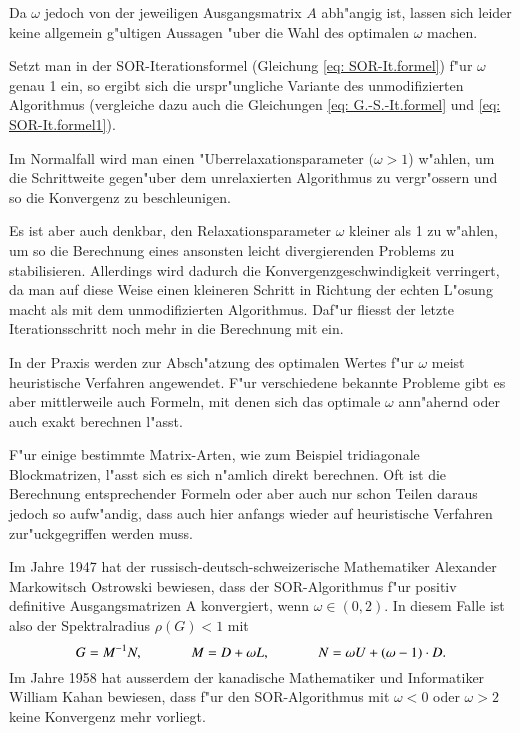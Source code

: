 \begin{refsection}
Da $\omega$ jedoch von der jeweiligen Ausgangsmatrix $A$ abh"angig ist,
lassen sich leider keine allgemein g"ultigen Aussagen "uber die Wahl
des optimalen $\omega$ machen.

Setzt man in der SOR-Iterationsformel (Gleichung \ref{eq: SOR-It.formel})
f"ur $\omega$ genau 1 ein, so ergibt sich die urspr"ungliche Variante
des unmodifizierten Algorithmus (vergleiche dazu auch die Gleichungen
\ref{eq: G.-S.-It.formel} und \ref{eq: SOR-It.formel1}).

Im Normalfall wird man einen "Uberrelaxationsparameter $(\omega > 1$)
w"ahlen, um die Schrittweite gegen"uber dem unrelaxierten Algorithmus
zu vergr"ossern und so die Konvergenz zu beschleunigen.

Es ist aber auch denkbar, den Relaxationsparameter $\omega$ kleiner
als 1 zu w"ahlen, um so die Berechnung eines ansonsten leicht
divergierenden Problems zu stabilisieren. Allerdings wird dadurch die
Konvergenzgeschwindigkeit verringert, da man auf diese Weise einen
kleineren Schritt in Richtung der echten L"osung macht als mit dem
unmodifizierten Algorithmus. Daf"ur fliesst der letzte Iterationsschritt
noch mehr in die Berechnung mit ein.

In der Praxis werden zur Absch"atzung des optimalen Wertes f"ur $\omega$
meist heuristische Verfahren angewendet. F"ur verschiedene bekannte
Probleme gibt es aber mittlerweile auch Formeln, mit denen sich das
optimale $\omega$ ann"ahernd oder auch exakt berechnen l"asst.

F"ur einige bestimmte Matrix-Arten, wie zum Beispiel tridiagonale
Blockmatrizen, l"asst sich es sich n"amlich direkt berechnen. Oft ist die
Berechnung entsprechender Formeln oder aber auch nur schon Teilen daraus
jedoch so aufw"andig, dass auch hier anfangs wieder auf heuristische
Verfahren zur"uckgegriffen werden muss.

Im Jahre 1947 hat der russisch-deutsch-schweizerische Mathematiker
Alexander Markowitsch Ostrowski \cite{AlexanderMarkowitschOstrowski}
bewiesen, dass der SOR-Algorithmus f"ur positiv definitive
Ausgangsmatrizen A konvergiert, wenn $\omega \in (0,2)$. In diesem Falle
ist also der Spektralradius $\rho(G) < 1$ mit
\begin{equation} \label{Spektralradius}
G=M^{-1}N,\hspace{.1\textwidth}
M=D+\omega L,\hspace{.1\textwidth}
N=\omega U+(\omega-1)\cdot D.
\end{equation}
Im Jahre 1958 hat ausserdem der kanadische Mathematiker und Informatiker
William Kahan \cite{WilliamKahan} bewiesen, dass f"ur den SOR-Algorithmus
mit $\omega < 0$ oder $\omega > 2$ keine Konvergenz mehr vorliegt.
			

\end{refsection}
